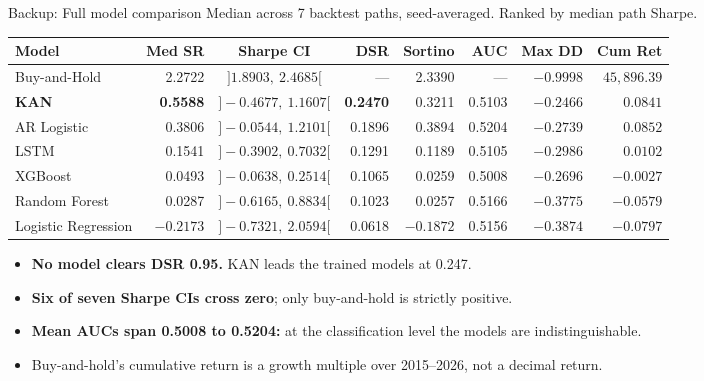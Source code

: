 \documentclass[aspectratio=169, t]{beamer}
\begin{document}
\begin{frame}{Backup: Full model comparison}
\vspace{-0.6em}
\centering
{\footnotesize Median across 7 backtest paths, seed-averaged. Ranked by median path Sharpe.}
\vspace{0.5em}

\begin{center}
\renewcommand{\arraystretch}{1.3}
\tiny
\begin{tabular}{l r c r r r r r}
\toprule
\textbf{Model} & \textbf{Med SR} & \textbf{Sharpe CI} & \textbf{DSR} & \textbf{Sortino} & \textbf{AUC} & \textbf{Max DD} & \textbf{Cum Ret} \\
\midrule
Buy-and-Hold & 2.2722 & $]1.8903,\ 2.4685[$ & --- & 2.3390 & --- & $-0.9998$ & $45{,}896.39$ \\
\midrule
\textbf{KAN} & \textbf{0.5588} & $]-0.4677,\ 1.1607[$ & \textbf{0.2470} & 0.3211 & 0.5103 & $\mathbf{-0.2466}$ & $0.0841$ \\
AR Logistic & 0.3806 & $]-0.0544,\ 1.2101[$ & 0.1896 & 0.3894 & 0.5204 & $-0.2739$ & $0.0852$ \\
LSTM & 0.1541 & $]-0.3902,\ 0.7032[$ & 0.1291 & 0.1189 & 0.5105 & $-0.2986$ & $0.0102$ \\
XGBoost & 0.0493 & $]-0.0638,\ 0.2514[$ & 0.1065 & 0.0259 & 0.5008 & $-0.2696$ & $-0.0027$ \\
Random Forest & 0.0287 & $]-0.6165,\ 0.8834[$ & 0.1023 & 0.0257 & 0.5166 & $-0.3775$ & $-0.0579$ \\
Logistic Regression & $-0.2173$ & $]-0.7321,\ 2.0594[$ & 0.0618 & $-0.1872$ & 0.5156 & $-0.3874$ & $-0.0797$ \\
\bottomrule
\end{tabular}
\end{center}
\vspace{0.5em}

\begin{itemize}\scriptsize\setlength{\itemsep}{3pt}
  \item \textbf{No model clears DSR 0.95.} KAN leads the trained models at 0.247.
  \item \textbf{Six of seven Sharpe CIs cross zero}; only buy-and-hold is strictly positive.
  \item \textbf{Mean AUCs span 0.5008 to 0.5204:} at the classification level the models are indistinguishable.
  \item Buy-and-hold's cumulative return is a growth multiple over 2015--2026, not a decimal return.
\end{itemize}

\end{frame}
\end{document}
